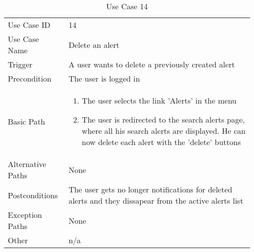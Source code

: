 \begin{table}[H]
\centering
\label{table-use-case-14}
\begin{tabular}{|p{3cm}|p{10cm}}
Use Case ID       & 14                                                         \\
Use Case Name     & Delete an alert                                      \\
Trigger           & A user wants to delete a previously created alert	\\
Precondition      & The user is logged in               \\
Basic Path        & \begin{enumerate}
\item The user selects the link 'Alerts' in the menu
\item The user is redirected to the search alerts page, where all his search
alerts are displayed. He can now delete each alert with the 'delete' buttons
\end{enumerate} 
     \\
Alternative Paths & None                          \\
Postconditions    & The user gets no longer notifications for deleted alerts and they dissapear from the active alerts list    \\
Exception Paths   & None			\\
Other             & n/a                                                                                                                                                                                                        
\end{tabular}
\caption{Use Case 14}
\end{table}


